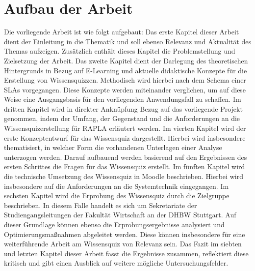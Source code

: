 \section{Aufbau der Arbeit}
Die vorliegende Arbeit ist wie folgt aufgebaut: Das erste Kapitel
dieser Arbeit dient der Einleitung in die Thematik und soll ebenso
Relevanz und Aktualität des Themas aufzeigen. Zusätzlich enthält dieses
Kapitel die Problemstellung und Zielsetzung der Arbeit. Das zweite Kapitel
dient der Darlegung des theoretischen Hintergrunds in Bezug auf
E-Learning und aktuelle didaktische Konzepte
für die Erstellung von Wissensquizzen. Methodisch wird hierbei
nach dem Schema einer \acp{SLA} vorgegangen. Diese Konzepte werden
miteinander verglichen, um auf diese Weise eine Ausgangsbasis
für den vorliegenden Anwendungsfall zu schaffen.
Im dritten Kapitel wird in direkter Anknüpfung Bezug auf das vorliegende Projekt
genommen, indem der Umfang, der Gegenstand und die Anforderungen an die Wissensquizerstellung
für \ac{RAPLA} erläutert werden.
Im vierten Kapitel wird der erste Konzeptentwurf für das Wissensquiz
dargestellt. Hierbei wird insbesondere thematisiert, in welcher Form
die vorhandenen Unterlagen einer Analyse unterzogen werden. Darauf aufbauend
werden basierend auf den Ergebnissen des ersten Schrittes die Fragen für das Wissensquiz
erstellt. Im fünften Kapitel wird die technische Umsetzung des Wissensquiz
in Moodle beschrieben. Hierbei wird insbesondere auf die Anforderungen an die
Systemtechnik eingegangen. Im sechsten Kapitel wird die Erprobung des Wissensquiz
durch die Zielgruppe beschrieben. In diesem Falle handelt es sich um Sekretariate
der Studiengangsleitungen der Fakultät Wirtschaft an der \ac{DHBW} Stuttgart.
Auf dieser Grundlage können ebenso die Erprobungsergebnisse analysiert und
Optimierungsmaßnahmen abgeleitet werden.
Diese können insbesondere für eine weiterführende Arbeit
am Wissensquiz von Relevanz sein. Das Fazit im siebten und letzten Kapitel
dieser Arbeit fasst die Ergebnisse zusammen, reflektiert diese kritisch und gibt einen Ausblick auf
weitere mögliche Untersuchungsfelder.



